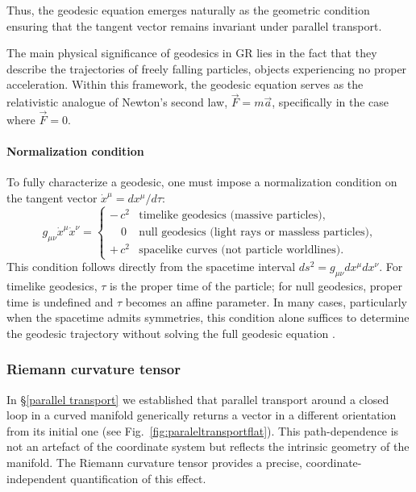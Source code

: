 Thus, the geodesic equation emerges naturally as the geometric condition ensuring that the tangent vector remains invariant under parallel transport.

The main physical significance of geodesics in GR lies in the fact that they describe the trajectories of freely falling particles, objects experiencing no proper acceleration. Within this framework, the geodesic equation serves as the relativistic analogue of Newton's second law, \(\vec{F} = m \vec{a}\), specifically in the case where \(\vec{F} = 0\).


\paragraph{Normalization condition}

To fully characterize a geodesic, one must impose a normalization condition on the tangent vector $\dot{x}^\mu = dx^\mu/d\tau$:
\begin{equation}
g_{\mu\nu}\dot{x}^\mu \dot{x}^\nu =
\begin{cases}-\,c^2 & \text{timelike geodesics (massive particles),} \\[2mm]
\, \, \, \, \, \, 0 & \text{null geodesics (light rays or massless particles),} \\[1mm]
+\,c^2 & \text{spacelike curves (not particle worldlines).}
\end{cases}
\end{equation}
This condition follows directly from the spacetime interval 
$ds^2 = g_{\mu\nu} dx^\mu dx^\nu$. For timelike geodesics, $\tau$ is the proper time of the particle; for null geodesics, proper time is undefined and $\tau$ becomes an affine parameter. In many cases, particularly when the spacetime admits symmetries, this condition alone 
suffices to determine the geodesic trajectory without solving the full geodesic equation \cite{llibrecarroll2004lectures}.


\subsubsection{Riemann curvature tensor}
\label{Riemann curvature tensor}


In \S\ref{parallel transport} we established that parallel transport around a closed loop in a curved manifold generically returns a vector in a different orientation from its initial one (see Fig.~\ref{fig:paraleltransportflat}). This path-dependence is not an artefact of the coordinate system but reflects the intrinsic geometry of the manifold. The Riemann curvature tensor provides a precise, coordinate-independent quantification of this effect.

